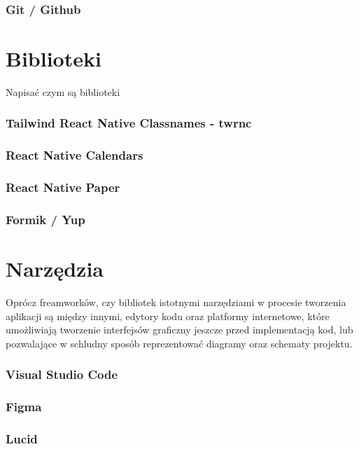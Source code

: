 \subsubsection*{\textbf{Git / Github}}
\phantom{Th}

\section{Biblioteki}
Napisać czym są biblioteki
\subsubsection*{\textbf{Tailwind React Native Classnames - twrnc}}
\phantom{th}

\subsubsection*{\textbf{React Native Calendars}}
\phantom{th}

\subsubsection*{\textbf{React Native Paper}}
\phantom{th}

\subsubsection*{\textbf{Formik / Yup}}
\phantom{th}

\section{Narzędzia}
\phantom{Th}
Oprócz freamworków, czy bibliotek istotnymi narzędziami w procesie tworzenia aplikacji są między innymi, edytory kodu oraz platformy internetowe, które umożliwiają tworzenie interfejsów graficzny jeszcze przed implementacją kod, lub pozwalające w schludny sposób reprezentować diagramy oraz schematy projektu.
\subsubsection*{\textbf{Visual Studio Code}}
\phantom{Th}

\subsubsection*{\textbf{Figma}}
\phantom{Th}

\subsubsection*{\textbf{Lucid}}
\phantom{Th}